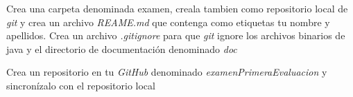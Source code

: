 \documentclass[addpoints,12pt]{exam}
\begin{document}
\begin{center}
\end{center}
\vspace{0.1in}
Crea una carpeta denominada examen, creala tambien como repositorio local de \emph{git} y crea un archivo \emph{REAME.md} que contenga como etiquetas tu nombre y apellidos. Crea un archivo \emph{.gitignore} para que \textit{git} ignore los archivos binarios de java y el directorio de documentación denominado \textit{doc}\par 
Crea un repositorio en tu \textit{GitHub} denominado \emph{examenPrimeraEvaluacion} y sincronízalo con el repositorio local
\end{document}
